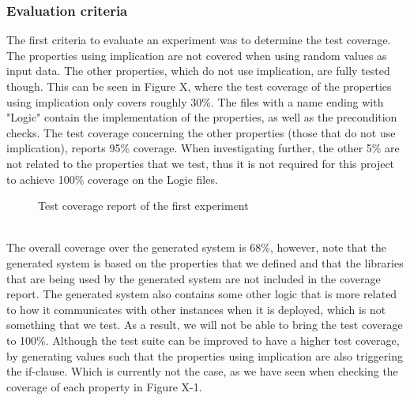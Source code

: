 \subsubsection{Evaluation criteria}
The first criteria to evaluate an experiment was to determine the test coverage. The properties using implication are not covered when using random values as input data. The other properties, which do not use implication, are fully tested though. This can be seen in Figure X, where the test coverage of the properties using implication only covers roughly 30\%. The files with a name ending with "Logic" contain the implementation of the properties, as well as the precondition checks. The test coverage concerning the other properties (those that do not use implication), reports 95\% coverage. When investigating further, the other 5\% are not related to the properties that we test, thus it is not required for this project to achieve 100\% coverage on the Logic files.\\
\begin{figure}[h!]
\caption{Test coverage report of the first experiment}
\label{fig:ch5_eval_experiment1}
\centering
\end{figure}
\\
The overall coverage over the generated system is 68\%, however, note that the generated system is based on the properties that we defined and that the libraries that are being used by the generated system are not included in the coverage report. The generated system also contains some other logic that is more related to how it communicates with other instances when it is deployed, which is not something that we test. As a result, we will not be able to bring the test coverage to 100\%. Although the test suite can be improved to have a higher test coverage, by generating values such that the properties using implication are also triggering the if-clause. Which is currently not the case, as we have seen when checking the coverage of each property in Figure X-1.\\
